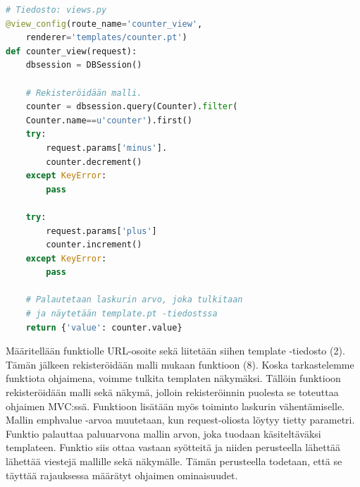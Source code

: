 \documentclass[finnish,utf8,nonumbib,palatino,kandi]{gradu2}
\begin{document}
\begin{lstlisting}[language=Python]
# Tiedosto: views.py
@view_config(route_name='counter_view',
	renderer='templates/counter.pt')
def counter_view(request):
    dbsession = DBSession()

    # Rekisteröidään malli.
    counter = dbsession.query(Counter).filter(
	Counter.name==u'counter').first()
    try:
        request.params['minus'].
        counter.decrement()
    except KeyError:
        pass

    try:
        request.params['plus']
        counter.increment()
    except KeyError:
        pass

    # Palautetaan laskurin arvo, joka tulkitaan
    # ja näytetään template.pt -tiedostssa
    return {'value': counter.value}
\end{lstlisting}

Määritellään funktiolle URL-osoite sekä liitetään siihen template -tiedosto (2). Tämän jälkeen rekisteröidään malli mukaan funktioon (8). Koska tarkastelemme funktiota ohjaimena, voimme tulkita templaten näkymäksi. Tällöin funktioon rekisteröidään malli sekä näkymä, jolloin rekisteröinnin puolesta se toteuttaa ohjaimen MVC:ssä.
Funktioon lisätään myös toiminto laskurin vähentämiselle. Mallin emph{value} -arvoa muutetaan, kun request-oliosta löytyy tietty parametri. Funktio palauttaa paluuarvona mallin arvon, joka tuodaan käsiteltäväksi templateen. Funktio siis ottaa vastaan syötteitä ja niiden perusteella lähettää lähettää viestejä
mallille sekä näkymälle. Tämän perusteella todetaan, että se täyttää rajauksessa määrätyt ohjaimen ominaisuudet. \\
\end{document}
